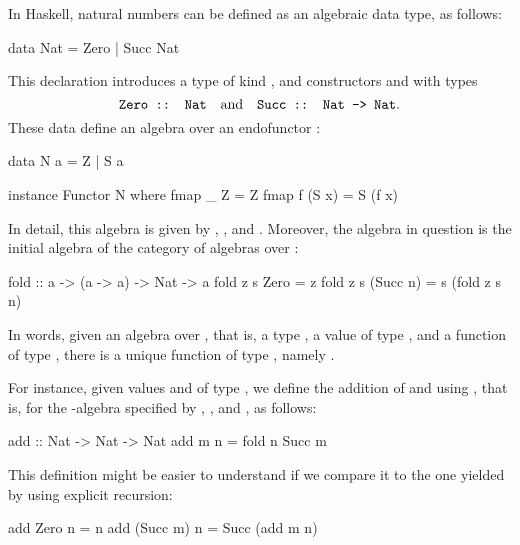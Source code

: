 \begin{example}
  \label{ex:algebra-natural-haskell}


  In Haskell, natural numbers can be defined as an algebraic data
  type, as follows:
  \begin{codehaskell}
data Nat = Zero | Succ Nat
  \end{codehaskell}
  This declaration introduces a type  of kind
  \texthaskell{*}, and constructors  and
   with types
  \begin{equation*}
    \text{\texttt{Zero :: Nat}}
    \quad
    \text{and}
    \quad
    \text{\texttt{Succ :: Nat -> Nat}}
    \text{.}
  \end{equation*}
  These data define an algebra over an endofunctor :
  \begin{codehaskell}
data N a = Z | S a

instance Functor N where
  fmap _ Z     = Z
  fmap f (S x) = S (f x)
\end{codehaskell}
  In detail, this algebra is given by ,
  , and . Moreover, the algebra in
  question is the initial algebra of the category of algebras over
  :
  \begin{codehaskell}
fold :: a -> (a -> a) -> Nat -> a
fold z s Zero     = z
fold z s (Succ n) = s (fold z s n)
  \end{codehaskell}
  In words, given an algebra over , that is, a type
  , a value  of type ,
  and a function  of type , there
  is a unique function of type , namely
  .

  For instance, given values  and  of
  type , we define the addition of 
  and  using , that is,
   for the -algebra specified by
  , , and , as
  follows:
  \begin{codehaskell}
add :: Nat -> Nat -> Nat
add m n = fold n Succ m
  \end{codehaskell}
  This definition might be easier to understand if we compare it to
  the one yielded by using explicit recursion:
  \begin{codehaskell}
add Zero     n = n
add (Succ m) n = Succ (add m n)
  \end{codehaskell}


\end{example}
